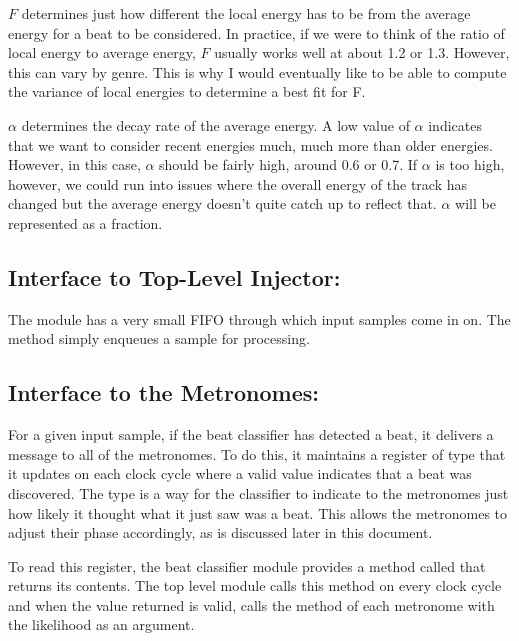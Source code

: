 \documentclass[letterpaper]{article}
\begin{document}
    $F$ determines just how different the local energy has to be from the
    average energy for a beat to be considered.  In practice, if we were to
    think of the ratio of local energy to average energy, $F$ usually works
    well at about 1.2 or 1.3.  However, this can vary by genre.  This is why I
    would eventually like to be able to compute the variance of local energies
    to determine a best fit for F.

    $\alpha$ determines the decay rate of the average energy.  A low value of
    $\alpha$ indicates that we want to consider recent energies much, much more
    than older energies.  However, in this case, $\alpha$ should be fairly
    high, around 0.6 or 0.7.  If $\alpha$ is too high, however, we could run
    into issues where the overall energy of the track has changed but the
    average energy doesn't quite catch up to reflect that.  $\alpha$ will be
    represented as a  fraction.


    \subsection{Interface to Top-Level Injector: }

    The module has a very small FIFO through which input samples come in on.
    The method  simply enqueues a sample for processing.
        

    \subsection{Interface to the Metronomes: }
    \label{sec:bc:metif}

    For a given input sample, if the beat classifier has detected a beat,
    it delivers a message to all of the metronomes.  To do this, it
    maintains a register of type  that it
    updates on each clock cycle where a valid value indicates that a beat
    was discovered.  The  type is a way for the
    classifier to indicate to the metronomes just how likely it thought
    what it just saw was a beat.  This allows the metronomes to adjust
    their phase accordingly, as is discussed later in this document.

    To read this register, the beat classifier module provides a method
    called  that returns its contents.  The top level module
    calls this method on every clock cycle and when the value returned is
    valid, calls the  method of each metronome with the
    likelihood as an argument.
\end{document}
